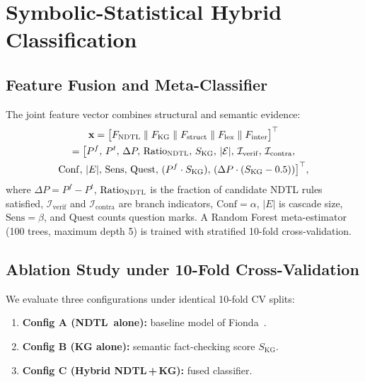 \documentclass[10pt,twocolumn,a4paper]{article}
\newcommand{\NDTL}{\textsc{NDTL}}
\newcommand{\SKG}{S_{\mathrm{KG}}}
\begin{document}
\section{Symbolic-Statistical Hybrid Classification}
\subsection{Feature Fusion and Meta-Classifier}
The joint feature vector combines structural and semantic evidence:
\begin{multline}
\mathbf{x}=\big[F_{\mathrm{NDTL}} \parallel F_{\mathrm{KG}} \parallel F_{\mathrm{struct}} \parallel F_{\mathrm{lex}} \parallel F_{\mathrm{inter}}\big]^{\top}\\
=\big[P^f,\,P^t,\,\Delta P,\,\mathrm{Ratio}_{\NDTL},\,\SKG,\,|\mathcal{E}|,\,\mathcal{I}_{\mathrm{verif}},\,\mathcal{I}_{\mathrm{contra}},\\
\mathrm{Conf},\,|E|,\,\mathrm{Sens},\,\mathrm{Quest},\,(P^f\cdot\SKG),\,(\Delta P\cdot(\SKG-0.5))\big]^{\top},
\end{multline}
where $\Delta P = P^f - P^t$, $\mathrm{Ratio}_{\NDTL}$ is the fraction of candidate NDTL rules satisfied, $\mathcal{I}_{\mathrm{verif}}$ and $\mathcal{I}_{\mathrm{contra}}$ are branch indicators, $\mathrm{Conf} = \alpha$, $|E|$ is cascade size, $\mathrm{Sens} = \beta$, and $\mathrm{Quest}$ counts question marks. A Random Forest meta-estimator (100 trees, maximum depth 5) is trained with stratified 10-fold cross-validation.
 
\subsection{Ablation Study under 10-Fold Cross-Validation}
We evaluate three configurations under identical 10-fold CV splits:
\begin{enumerate}
  \item \textbf{Config A (\NDTL\ alone):} baseline model of Fionda~\cite{fionda2025}.
  \item \textbf{Config B (KG alone):} semantic fact-checking score $\SKG$.
  \item \textbf{Config C (Hybrid \NDTL\,+\,KG):} fused classifier.
\end{enumerate}
 
\end{document}
